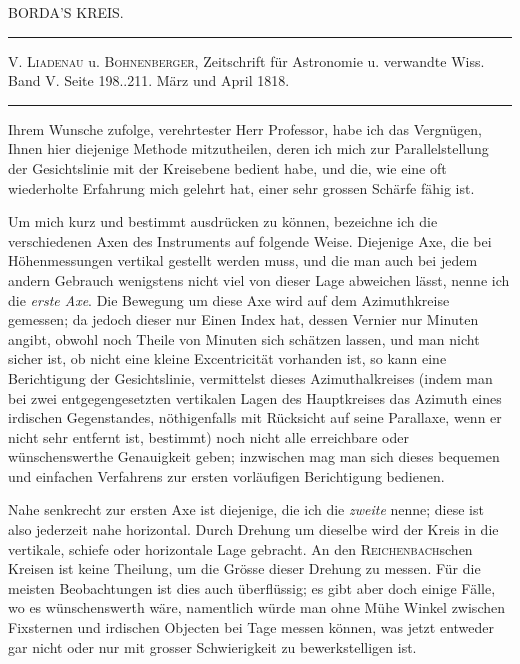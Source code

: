 \clearpage{}\hypertarget{native-409-part-lower}{}\label{native-409-part-lower}
\begin{center}\large BORDA’S KREIS.\end{center}
\begin{center}\hrule\vspace{4pt}\fontsize{10}{12}\selectfont V. \textsc{Liadenau} u. \textsc{Bohnenberger}, Zeitschrift für Astronomie u. verwandte Wiss.\\ Band V. Seite 198..211. März und April 1818.\par\vspace{4pt}\hrule\vspace{4pt}\end{center}
\par\indent Ihrem Wunsche zufolge, verehrtester Herr Professor, habe ich das Vergnügen, Ihnen hier diejenige Methode mitzutheilen, deren ich mich zur Parallelstellung der Gesichtslinie mit der Kreisebene bedient habe, und die, wie eine oft wiederholte Erfahrung mich gelehrt hat, einer sehr grossen Schärfe fähig ist.

\par\indent Um mich kurz und bestimmt ausdrücken zu können, bezeichne ich die verschiedenen Axen des Instruments auf folgende Weise. Diejenige Axe, die bei Höhenmessungen vertikal gestellt werden muss, und die man auch bei jedem andern Gebrauch wenigstens nicht viel von dieser Lage abweichen lässt, nenne ich die \emph{erste Axe}. Die Bewegung um diese Axe wird auf dem Azimuthkreise gemessen; da jedoch dieser nur Einen Index hat, dessen Vernier nur Minuten angibt, obwohl noch Theile von Minuten sich schätzen lassen, und man nicht sicher ist, ob nicht eine kleine Excentricität vorhanden ist, so kann eine Berichtigung der Gesichtslinie, vermittelst dieses Azimuthalkreises (indem man bei zwei entgegengesetzten vertikalen Lagen des Hauptkreises das Azimuth eines irdischen Gegenstandes, nöthigenfalls mit Rücksicht auf seine Parallaxe, wenn er nicht sehr entfernt ist, bestimmt) noch nicht alle erreichbare oder wünschenswerthe Genauigkeit geben; inzwischen mag man sich dieses bequemen und einfachen Verfahrens zur ersten vorläufigen Berichtigung bedienen.

\par\indent Nahe senkrecht zur ersten Axe ist diejenige, die ich die \emph{zweite} nenne; diese ist also jederzeit nahe horizontal. Durch Drehung um dieselbe wird der Kreis in die vertikale, schiefe oder horizontale Lage gebracht. An den \textsc{Reichenbach}schen Kreisen ist keine Theilung, um die Grösse dieser Drehung zu messen. Für die meisten Beobachtungen ist dies auch überflüssig; es gibt aber doch einige Fälle, wo es wünschenswerth wäre, namentlich würde man ohne Mühe Winkel zwischen Fixsternen und irdischen Objecten bei Tage messen können, was jetzt entweder gar nicht oder nur mit grosser Schwierigkeit zu bewerkstelligen ist.

